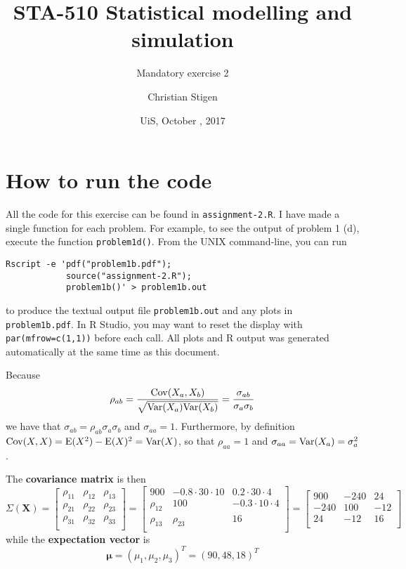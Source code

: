 \documentclass[a4paper,english,12pt]{article}
\title{STA-510 Statistical modelling and simulation}
\subtitle{Mandatory exercise 2}
\author{Christian Stigen}
\date{UiS, October \nth{19}, 2017}
\begin{document}
\maketitle
\section*{\normalsize{How to run the code}}
All the code for this exercise can be found in \texttt{assignment-2.R}. I have
made a single function for each problem. For example, to see the output of
problem 1 (d), execute the function \texttt{problem1d()}.  From the UNIX
command-line, you can run
\begin{verbatim}
Rscript -e 'pdf("problem1b.pdf");
            source("assignment-2.R");
            problem1b()' > problem1b.out
\end{verbatim}
to produce the textual output file \texttt{problem1b.out} and any plots in
\texttt{problem1b.pdf}. In R Studio, you may want to reset the display with
\texttt{par(mfrow=c(1,1))} before each call. All plots and R output was
generated automatically at the same time as this document.

\label{problem.1a}
Because
\begin{align*}
  \rho_{ab} &= \frac{\mathrm{Cov}(X_a, X_b)}{\sqrt{\mathrm{Var}(X_a)\mathrm{Var}(X_b)}} =
    \frac{\sigma_{ab}}{\sigma_a\sigma_b} \\
\end{align*}
we have that $\sigma_{ab} = \rho_{ab}\sigma_a\sigma_b$ and $\sigma_{aa} = 1$.
Furthermore, by definition $\mathrm{Cov}(X,X) = \mathrm{E}(X^2) - \mathrm{E}(X)^2 = \mathrm{Var}(X)$,
so that $\rho_{aa} = 1$ and $\sigma_{aa} = \mathrm{Var}(X_a) = \sigma_a^2$.

The \textbf{covariance matrix} is then
\[
  \Sigma\left(\textbf{X}\right) =
    \begin{bmatrix}
      \rho_{11} & \rho_{12} & \rho_{13} \\
      \rho_{21} & \rho_{22} & \rho_{23} \\
      \rho_{31} & \rho_{32} & \rho_{33} \\
    \end{bmatrix}
  =
    \begin{bmatrix}
      900 & -0.8 \cdot 30 \cdot 10 & 0.2 \cdot 30 \cdot 4 \\
      \rho_{12} & 100 & -0.3 \cdot 10 \cdot 4 \\
      \rho_{13} & \rho_{23} & 16 \\
    \end{bmatrix}
  =
    \begin{bmatrix}
       900 & -240 &  24 \\
      -240 &  100 & -12 \\
        24 &  -12 &  16 \\
    \end{bmatrix}
\]
while the \textbf{expectation vector} is
\[
  \bm{\mu} = \left( \mu_1 , \mu_2, \mu_3 \right)^T 
    = \left( 90, 48, 18 \right)^T
\]
\end{document}
